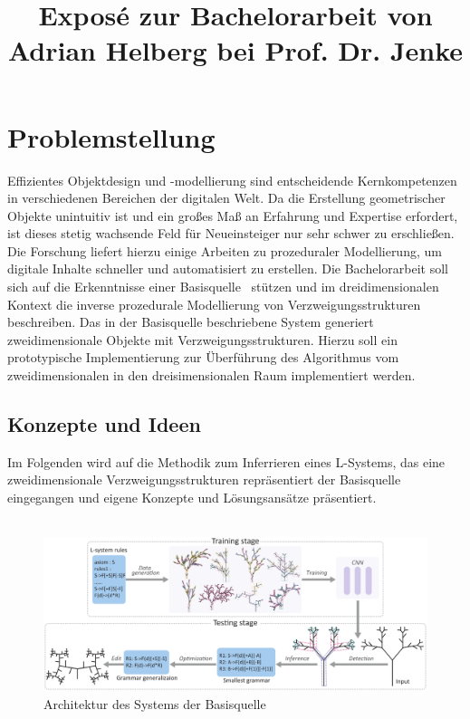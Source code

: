 \documentclass[11pt]{article}
\title{\textbf{Exposé} zur Bachelorarbeit von Adrian Helberg bei Prof. Dr. Jenke}
\begin{document}
    \maketitle

    \section{Problemstellung}

    Effizientes Objektdesign und -modellierung sind entscheidende Kernkompetenzen in verschiedenen Bereichen der
    digitalen Welt.
    Da die Erstellung geometrischer Objekte unintuitiv ist und ein großes Maß an Erfahrung und Expertise
    erfordert, ist dieses stetig wachsende Feld für Neueinsteiger nur sehr schwer zu erschließen.
    Die Forschung liefert hierzu einige Arbeiten zu prozeduraler Modellierung, um digitale Inhalte schneller und
    automatisiert zu erstellen.
    Die Bachelorarbeit soll sich auf die Erkenntnisse einer Basisquelle~\cite{basisquelle} stützen und im
    dreidimensionalen Kontext die inverse prozedurale Modellierung von Verzweigungsstrukturen beschreiben.
    Das in der Basisquelle beschriebene System generiert zweidimensionale Objekte mit Verzweigungsstrukturen.
    Hierzu soll ein prototypische Implementierung zur Überführung des Algorithmus vom zweidimensionalen in den
    dreisimensionalen Raum implementiert werden.\\

    \subsection{Konzepte und Ideen}
    Im Folgenden wird auf die Methodik zum Inferrieren eines L-Systems, das eine zweidimensionale Verzweigungsstrukturen
    repräsentiert der Basisquelle~\cite{basisquelle} eingegangen und eigene Konzepte und Lösungsansätze präsentiert.\\~\\

    \begin{figure}[H]
       \centering
       \includegraphics[width=\textwidth]{../images/System_2D.PNG}
       \caption[Systemarchitektur 2D]{Architektur des Systems der Basisquelle~\cite{basisquelle}}
    \end{figure}
\end{document}
